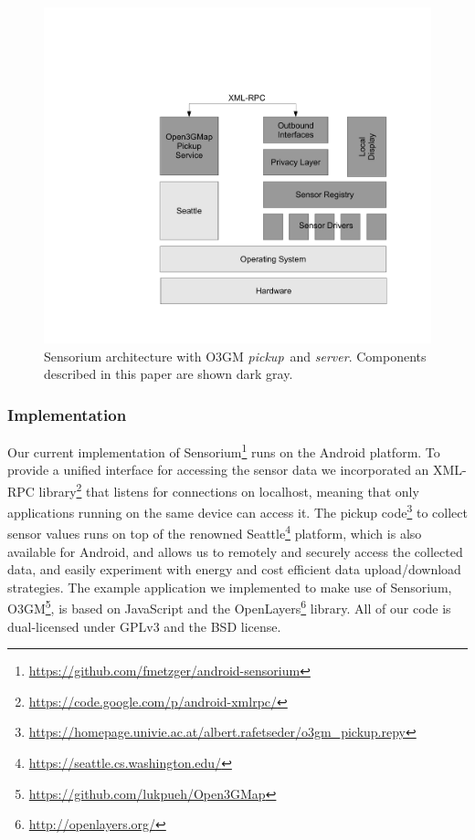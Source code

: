 \begin{figure}[t!]
\centering
\includegraphics[width=0.85\columnwidth]{images/architecture.pdf}
\caption{\small Sensorium architecture with O3GM \textit{pickup}~and \textit{server}. Components described in this paper are shown dark gray.}
\label{c5:fig:architecture}
\end{figure}

\subsubsection{Implementation}

Our current implementation of Sensorium\footnote{\url{https://github.com/fmetzger/android-sensorium}} runs on the Android platform. To provide a unified interface for accessing the sensor data we incorporated an XML-RPC library\footnote{\url{https://code.google.com/p/android-xmlrpc/}} that listens for connections on localhost, meaning that only applications running on the same device can access it. The pickup code\footnote{\url{https://homepage.univie.ac.at/albert.rafetseder/o3gm_pickup.repy}} to collect sensor values runs on top of the renowned Seattle\footnote{\url{https://seattle.cs.washington.edu/}} platform, which is also available for Android, and allows us to remotely and securely access the collected data, and easily experiment with energy and cost efficient data upload/download strategies. The example application we implemented to make use of Sensorium, O3GM\footnote{\url{https://github.com/lukpueh/Open3GMap}}, is based on JavaScript and the OpenLayers\footnote{\url{http://openlayers.org/}} library. All of our code is dual-licensed under GPLv3 and the BSD license.

